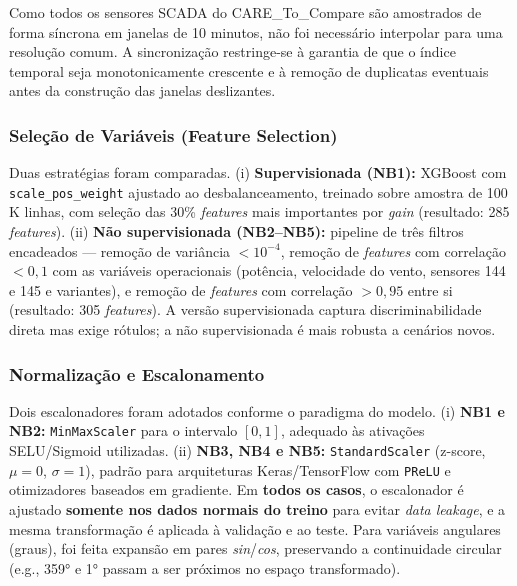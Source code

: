 \documentclass[12pt]{article}
\begin{document}
Como todos os sensores SCADA do CARE\_To\_Compare são amostrados de forma síncrona em janelas de 10 minutos, não foi necessário interpolar para uma resolução comum. A sincronização restringe-se à garantia de que o índice temporal seja monotonicamente crescente e à remoção de duplicatas eventuais antes da construção das janelas deslizantes.

\subsubsection{Seleção de Variáveis (Feature Selection)}

\begin{sloppypar}
Duas estratégias foram comparadas. (i) \textbf{Supervisionada (NB1):} XGBoost com \texttt{scale\_pos\_weight} ajustado ao desbalanceamento, treinado sobre amostra de 100\,K linhas, com seleção das 30\% \textit{features} mais importantes por \textit{gain} (resultado: 285 \textit{features}). (ii) \textbf{Não supervisionada (NB2--NB5):} pipeline de três filtros encadeados --- remoção de variância $< 10^{-4}$, remoção de \textit{features} com correlação $< 0{,}1$ com as variáveis operacionais (potência, velocidade do vento, sensores 144 e 145 e variantes), e remoção de \textit{features} com correlação $> 0{,}95$ entre si (resultado: 305 \textit{features}). A versão supervisionada captura discriminabilidade direta mas exige rótulos; a não supervisionada é mais robusta a cenários novos.
\end{sloppypar}

\subsubsection{Normalização e Escalonamento}

Dois escalonadores foram adotados conforme o paradigma do modelo. (i) \textbf{NB1 e NB2:} \texttt{MinMaxScaler} para o intervalo $[0,1]$, adequado às ativações SELU/Sigmoid utilizadas. (ii) \textbf{NB3, NB4 e NB5:} \texttt{StandardScaler} (z-score, $\mu=0$, $\sigma=1$), padrão para arquiteturas Keras/TensorFlow com \texttt{PReLU} e otimizadores baseados em gradiente. Em \textbf{todos os casos}, o escalonador é ajustado \textbf{somente nos dados normais do treino} para evitar \textit{data leakage}, e a mesma transformação é aplicada à validação e ao teste. Para variáveis angulares (graus), foi feita expansão em pares \textit{sin}/\textit{cos}, preservando a continuidade circular (e.g., 359° e 1° passam a ser próximos no espaço transformado).
\end{document}
